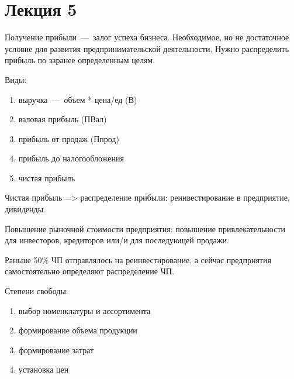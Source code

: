 \documentclass[14pt]{extarticle}
\begin{document}
\section{Лекция 5}

Получение прибыли~---~залог успеха бизнеса. Необходимое, но не достаточное условие для развития предпринимательской деятельности. Нужно распределить прибыль по заранее определенным целям. 

Виды:

\begin{enumerate}
	\item выручка~---~объем * цена/ед (В) 
	\item валовая прибыль (ПВал) 
	\item прибыль от продаж (Ппрод) 
	\item прибыль до налогообложения 
	\item чистая прибыль
\end{enumerate}

Чистая прибыль => распределение прибыли: реинвестирование в предприятие, дивиденды.

Повышение рыночной стоимости предприятия: повышение привлекательности для инвесторов, кредиторов или/и для последующей продажи.

Раньше 50\% ЧП отправлялось на реинвестирование, а сейчас предприятия самостоятельно определяют распределение ЧП.

Степени свободы:

\begin{enumerate}
	\item выбор номенклатуры и ассортимента
	\item формирование объема продукции
	\item формирование затрат
	\item установка цен
\end{enumerate}
\end{document}
